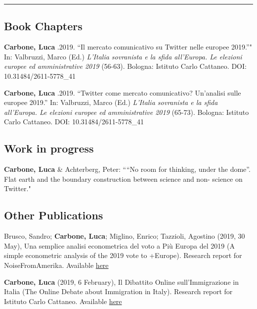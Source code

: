 \documentclass[12pt,]{article}
\begin{document}
\vspace{-10pt}
\rule{1\linewidth}{\linethickness}

\hypertarget{book-chapters}{%
\subsection{Book Chapters}\label{book-chapters}}

\textbf{Carbone, Luca} .2019. ``Il mercato comunicativo su Twitter nelle
europee 2019.''" In: Valbruzzi, Marco (Ed.) \emph{L'Italia sovranista e
la sfida all'Europa. Le elezioni europee ed amministrative 2019}
(56-63). Bologna: Istituto Carlo Cattaneo. DOI: 10.31484/2611-5778\_41

\textbf{Carbone, Luca} .2019. ``Twitter come mercato comunicativo?
Un'analisi sulle europee 2019.'' In: Valbruzzi, Marco (Ed.)
\emph{L'Italia sovranista e la sfida all'Europa. Le elezioni europee ed
amministrative 2019} (65-73). Bologna: Istituto Carlo Cattaneo. DOI:
10.31484/2611-5778\_41 \newline

\hypertarget{work-in-progress}{%
\subsection{Work in progress}\label{work-in-progress}}

\textbf{Carbone, Luca} \& Achterberg, Peter: ````No room for thinking,
under the dome''. Flat earth and the boundary construction between
science and non- science on Twitter." \newline

\hypertarget{other-publications}{%
\subsection{Other Publications}\label{other-publications}}

Brusco, Sandro; \textbf{Carbone, Luca}; Miglino, Enrico; Tazzioli,
Agostino (2019, 30 May), Una semplice analisi econometrica del voto a
Più Europa del 2019 (A simple econometric analysis of the 2019 vote to
+Europe). Research report for NoiseFromAmerika. Available
\href{http://noisefromamerika.org/articolo/semplice-analisi-econometrica-voto-piu-europa-2019?fbclid=IwAR12kLTGJAonRf3Ctb-HlXYBGAspUhOSclDpQCg-mis-mDzM9vY8kZU21v8}{here}

\textbf{Carbone, Luca} (2019, 6 February), Il Dibattito Online
sull'Immigrazione in Italia (The Online Debate about Immigration in
Italy). Research report for Istituto Carlo Cattaneo. Available
\href{http://www.cattaneo.org/2019/02/06/il-dibattito-online-sullimmigrazione-in-italia/}{here}
\end{document}
